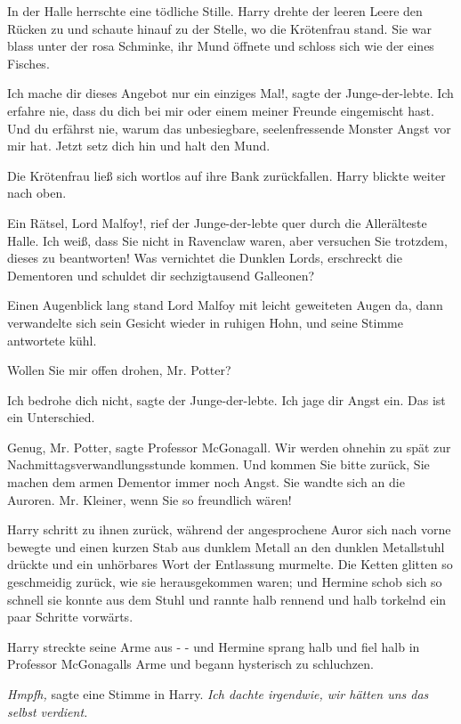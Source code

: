In der Halle herrschte eine tödliche Stille. Harry drehte der leeren Leere den
Rücken zu und schaute hinauf zu der Stelle, wo die Krötenfrau stand. Sie war
blass unter der rosa Schminke, ihr Mund öffnete und schloss sich wie der eines
Fisches.

\glqq Ich mache dir dieses Angebot nur ein einziges Mal!\grqq{}, sagte der
Junge-der-lebte. \glqq Ich erfahre nie, dass du dich bei mir oder einem meiner
Freunde eingemischt hast. Und du erfährst nie, warum das unbesiegbare,
seelenfressende Monster Angst vor mir hat. Jetzt setz dich hin und halt den
Mund.\grqq{}

Die Krötenfrau ließ sich wortlos auf ihre Bank zurückfallen. Harry blickte
weiter nach oben.

\glqq Ein Rätsel, Lord Malfoy!\grqq{}, rief der Junge-der-lebte quer durch die
Allerälteste Halle. \glqq Ich weiß, dass Sie nicht in Ravenclaw waren, aber
versuchen Sie trotzdem, dieses zu beantworten! Was vernichtet die Dunklen Lords,
erschreckt die Dementoren und schuldet dir sechzigtausend Galleonen?\grqq{}

Einen Augenblick lang stand Lord Malfoy mit leicht geweiteten Augen da, dann
verwandelte sich sein Gesicht wieder in ruhigen Hohn, und seine Stimme
antwortete kühl.

\glqq Wollen Sie mir offen drohen, Mr. Potter?\grqq{}

\glqq Ich bedrohe dich nicht\grqq{}, sagte der Junge-der-lebte. \glqq Ich jage
dir Angst ein. Das ist ein Unterschied.\grqq{}

\glqq Genug, Mr. Potter\grqq{}, sagte Professor McGonagall. \glqq Wir werden
ohnehin zu spät zur Nachmittagsverwandlungsstunde kommen. Und kommen Sie bitte
zurück, Sie machen dem armen Dementor immer noch Angst.\grqq{} Sie wandte sich
an die Auroren. \glqq Mr. Kleiner, wenn Sie so freundlich wären!\grqq{}

Harry schritt zu ihnen zurück, während der angesprochene Auror sich nach vorne
bewegte und einen kurzen Stab aus dunklem Metall an den dunklen Metallstuhl
drückte und ein unhörbares Wort der Entlassung murmelte. Die Ketten glitten so
geschmeidig zurück, wie sie herausgekommen waren; und Hermine schob sich so
schnell sie konnte aus dem Stuhl und rannte halb rennend und halb torkelnd ein
paar Schritte vorwärts.

Harry streckte seine Arme aus - - und Hermine sprang halb und fiel halb in
Professor McGonagalls Arme und begann hysterisch zu schluchzen.

\emph{Hmpfh,} sagte eine Stimme in Harry. \emph{Ich dachte irgendwie, wir hätten
uns das selbst verdient. }

